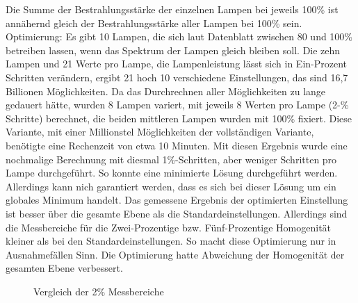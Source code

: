 \documentclass[a4paper,bibtotoc,oneside]{scrbook}
\begin{document}
Die Summe der Bestrahlungsstärke der einzelnen Lampen bei jeweils 100\% ist annähernd gleich der Bestrahlungsstärke aller Lampen bei 100\% sein. 
Optimierung: Es gibt 10 Lampen, die sich laut Datenblatt zwischen 80 und 100\% betreiben lassen, wenn das Spektrum der Lampen gleich bleiben soll. Die zehn Lampen und 21  Werte pro Lampe, die Lampenleistung lässt sich in Ein-Prozent Schritten verändern, ergibt 21 hoch 10 verschiedene Einstellungen, das sind 16,7 Billionen Möglichkeiten. Da das Durchrechnen aller Möglichkeiten zu lange gedauert hätte, wurden 8 Lampen variert, mit jeweils 8 Werten pro Lampe (2-\% Schritte) berechnet, die beiden mittleren Lampen wurden mit 100\% fixiert. Diese Variante, mit einer Millionstel Möglichkeiten der vollständigen Variante, benötigte eine Rechenzeit von etwa 10 Minuten. Mit diesen Ergebnis wurde eine nochmalige Berechnung mit diesmal 1\%-Schritten, aber weniger Schritten pro Lampe durchgeführt. So konnte eine minimierte Lösung durchgeführt werden. Allerdings kann nich garantiert werden, dass es sich bei dieser Lösung um ein globales Minimum handelt.
Das gemessene Ergebnis der optimierten Einstellung ist besser über die gesamte Ebene als die Standardeinstellungen.
Allerdings sind die Messbereiche für die Zwei-Prozentige bzw. Fünf-Prozentige Homogenität kleiner als bei den Standardeinstellungen. So macht diese Optimierung nur in Ausnahmefällen Sinn. Die Optimierung hatte Abweichung der Homogenität der gesamten Ebene verbessert.

\begin{figure}
\caption{Vergleich der 2\% Messbereiche}
\label{zwei}
\end{figure} 
\end{document}

